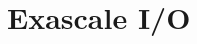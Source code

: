 \documentclass{../../template/esiwace-report}
\begin{document}
\section{Exascale I/O}














\end{document}
